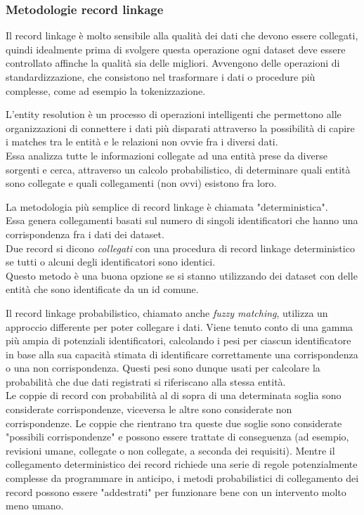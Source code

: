 \documentclass[a4paper,12pt]{article}
\begin{document}
\newpage
\subsubsection{Metodologie record linkage}

\begin{description}[align=left]
	\item[Data preprocessing] Il record linkage è molto sensibile alla qualità dei dati che devono essere collegati, quindi idealmente prima di svolgere questa operazione ogni dataset deve essere controllato affinche la qualità sia delle migliori. Avvengono delle operazioni di standardizzazione, che consistono nel trasformare i dati o procedure più complesse, come ad esempio la tokenizzazione.
	\item[Entity resolution] L'entity resolution è un processo di operazioni intelligenti che permettono alle organizzazioni di connettere i dati più disparati attraverso la possibilità di capire i matches tra le entità e le relazioni non ovvie fra i diversi dati.\\Essa analizza tutte le informazioni collegate ad una entità prese da diverse sorgenti e cerca, attraverso un calcolo probabilistico, di determinare quali entità sono collegate e quali collegamenti (non ovvi) esistono fra loro.
	\item[Deterministic record linkage] La metodologia più semplice di record linkage è chiamata "deterministica".\\Essa genera collegamenti basati sul numero di singoli identificatori che hanno una corrispondenza fra i dati dei dataset.\\Due record si dicono \textit{collegati} con una procedura di record linkage deterministico se tutti o alcuni degli identificatori sono identici.\\Questo metodo è una buona opzione se si stanno utilizzando dei dataset con delle entità che sono identificate da un id comune.
	\item[Probabilistic record linkage] Il record linkage probabilistico, chiamato anche \textit{fuzzy matching}, utilizza un approccio differente per poter collegare i dati. Viene tenuto conto di una gamma più ampia di potenziali identificatori, calcolando i pesi per ciascun identificatore in base alla sua capacità stimata di identificare correttamente una corrispondenza o una non corrispondenza. Questi pesi sono dunque usati per calcolare la probabilità che due dati registrati si riferiscano alla stessa entità.\\Le coppie di record con probabilità al di sopra di una determinata soglia sono considerate corrispondenze, viceversa le altre sono considerate non corrispondenze. Le coppie che rientrano tra queste due soglie sono considerate "possibili corrispondenze" e possono essere trattate di conseguenza (ad esempio, revisioni umane, collegate o non collegate, a seconda dei requisiti). Mentre il collegamento deterministico dei record richiede una serie di regole potenzialmente complesse da programmare in anticipo, i metodi probabilistici di collegamento dei record possono essere "addestrati" per funzionare bene con un intervento molto meno umano.

\end{description}
\end{document}
